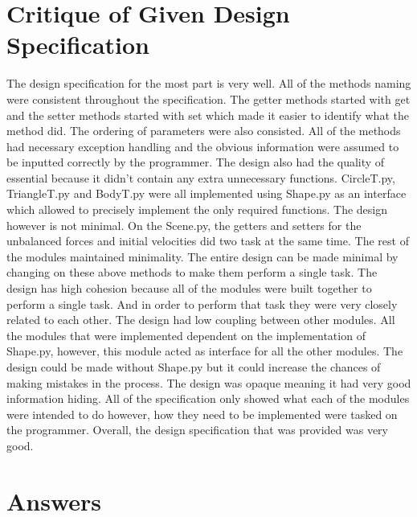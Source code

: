 \documentclass[12pt]{article}
\begin{document}
\section{Critique of Given Design Specification}
The design specification for the most part is very well. All of the methods naming were consistent throughout the specification. The getter methods started with get and the setter methods started with set which made it easier to identify what the method did. The ordering of parameters were also consisted. All of the methods had necessary exception handling and the obvious information were assumed to be inputted correctly by the programmer. The design also had the quality of essential because it didn't contain any extra unnecessary functions. CircleT.py, TriangleT.py and BodyT.py were all implemented using Shape.py as an interface which allowed to precisely implement the only required functions. The design however is not minimal. On the Scene.py, the getters and setters for the unbalanced forces and initial velocities did two task at the same time. The rest of the modules maintained minimality. The entire design can be made minimal by changing on these above methods to make them perform a single task. The design has high cohesion because all of the modules were built together to perform a single task. And in order to perform that task they were very closely related to each other. The design had low coupling between other modules. All the modules that were implemented dependent on the implementation of Shape.py, however, this module acted as interface for all the other modules. The design could be made without Shape.py but it could increase the chances of making mistakes in the process. The design was opaque meaning it had very good information hiding. All of the specification only showed what each of the modules were intended to do however, how they need to be implemented were tasked on the programmer. Overall, the design specification that was provided was very good.


\section{Answers}
\end{document}
